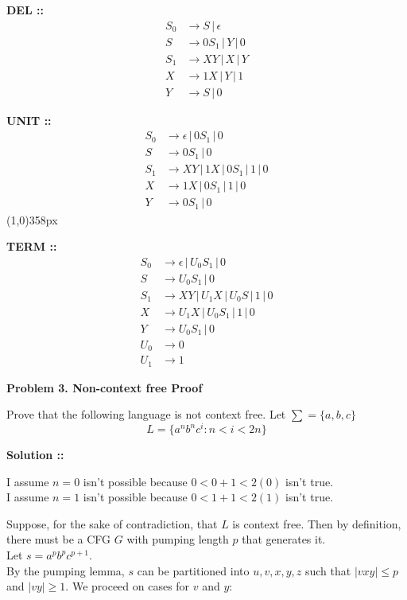 \documentclass[11pt]{article}
\begin{document}
\textbf{DEL ::}
\begin{align}
    S_0&\longrightarrow S \,|\, \epsilon \\
    S&\longrightarrow 0S_1 \,|\, Y \,|\, 0 \\
    S_1&\longrightarrow XY \,|\, X \,|\, Y \\
    X&\longrightarrow 1X \,|\, Y \,|\, 1 \\
    Y&\longrightarrow S \,|\, 0
\end{align}
\pagebreak

\textbf{UNIT ::}
\begin{align}
    S_0&\longrightarrow \epsilon \,|\, 0S_1 \,|\, 0 \\
    S&\longrightarrow 0S_1 \,|\, 0 \\
    S_1&\longrightarrow XY \,|\, 1X \,|\, 0S_1 \,|\, 1 \,|\, 0 \\
    X&\longrightarrow 1X \,|\, 0S_1 \,|\, 1 \,|\, 0 \\
    Y&\longrightarrow 0S_1 \,|\, 0
\end{align}
\line(1,0){358px}

\textbf{TERM ::}
\begin{align}
    S_0&\longrightarrow \epsilon \,|\, U_0S_1 \,|\, 0 \\
    S&\longrightarrow U_0S_1 \,|\, 0 \\
    S_1&\longrightarrow XY \,|\, U_1X \,|\, U_0S \,|\, 1 \,|\, 0 \\
    X&\longrightarrow U_1X \,|\, U_0S_1 \,|\, 1 \,|\, 0 \\
    Y&\longrightarrow U_0S_1 \,|\, 0 \\
    U_0&\longrightarrow 0 \\
    U_1&\longrightarrow 1
\end{align}
\pagebreak


\textbf{Problem 3. Non-context free Proof}

Prove that the following language is not context free. Let $\sum = \{a,b,c\}$
$$L = \{a^nb^nc^i : n < i < 2n\}$$

\vspace{5px}\textbf{Solution ::}

I assume $n=0$ isn't possible because $0 < 0+1 < 2(0)$ isn't true. \\
I assume $n=1$ isn't possible because $0 < 1+1 < 2(1)$ isn't true.

\vspace{7px}Suppose, for the sake of contradiction, that $L$ is context free. Then by
definition, there must be a CFG $G$ with pumping length $p$ that generates it. \\
Let $s = a^pb^pc^{p+1}$. \\
By the pumping lemma, $s$ can be partitioned into $u, v, x, y, z$ such that $|vxy| \le p$
and $|vy|\ge 1$. We proceed on cases for $v$ and $y$:
\end{document}
